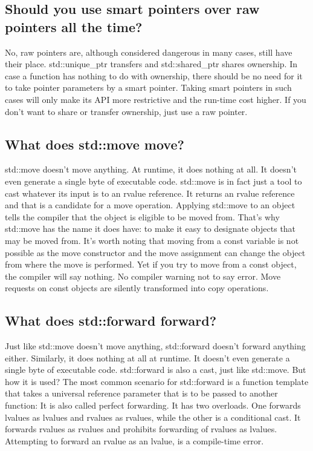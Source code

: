 \documentclass{report}
\begin{document}
\bigbreak \noindent 
\subsection{Should you use smart pointers over raw pointers all the time?}
\bigbreak \noindent 
No, raw pointers are, although considered dangerous in many cases, still have their place.
\bigbreak \noindent 
std::unique\_ptr transfers and std::shared\_ptr shares ownership.
\bigbreak \noindent 
In case a function has nothing to do with ownership, there should
be no need for it to take pointer parameters by a smart pointer.
Taking smart pointers in such cases will only make its API more
restrictive and the run-time cost higher.
\bigbreak \noindent 
 If you don’t want to share or transfer ownership, just use a raw pointer.

 \pagebreak 
 \bigbreak \noindent 
 \subsection{ What does std::move move?}
 \bigbreak \noindent 
 std::move doesn’t move anything. At runtime, it does nothing at all. It doesn’t even generate a single byte of executable code.
 \bigbreak \noindent 
 std::move is in fact just a tool to cast whatever its input is to an rvalue reference.
 \bigbreak \noindent 
 It returns an rvalue reference and that is a candidate for a move operation. Applying std::move to an object tells the compiler that the object is eligible to be moved from. That’s why std::move has the name it does have: to make it easy to designate objects that may be moved from.
 \bigbreak \noindent 
 It’s worth noting that moving from a const variable is not possible as the move constructor and the move assignment can change the object from where the move is performed. Yet if you try to move from a const object, the compiler will say nothing. No compiler warning not to say error. Move requests on const objects are silently transformed into copy operations.

 \bigbreak \noindent 
 \subsection{What does std::forward forward?}
 \bigbreak \noindent 
 Just like std::move doesn’t move anything, std::forward doesn’t forward anything either. Similarly, it does nothing at all at runtime. It doesn’t even generate a single byte of executable code.
 \bigbreak \noindent 
 std::forward is also a cast, just like std::move. But how it is used?
 \bigbreak \noindent 
 The most common scenario for std::forward is a function template that takes a universal reference parameter that is to be passed to another function:
 \bigbreak \noindent 
 It is also called perfect forwarding. It has two overloads.
 \bigbreak \noindent 
 One forwards lvalues as lvalues and rvalues as rvalues, while the
 other is a conditional cast. It forwards rvalues as rvalues and
 prohibits forwarding of rvalues as lvalues. Attempting to forward
 an rvalue as an lvalue, is a compile-time error.
\end{document}
